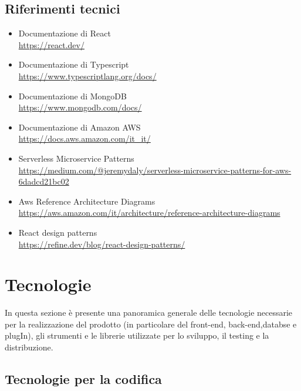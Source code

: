 \documentclass{article}
\begin{document}
{\subsection{Riferimenti tecnici}
\begin{itemize}
\item Documentazione di React \\ \href{ https://react.dev/}{ https://react.dev/}
\item Documentazione di Typescript \\ \href{https://www.typescriptlang.org/docs/}{https://www.typescriptlang.org/docs/}
\item Documentazione di MongoDB \\ \href{https://www.mongodb.com/docs/}{https://www.mongodb.com/docs/}
\item Documentazione di Amazon AWS \\ \href{https://docs.aws.amazon.com/it_it/}{https://docs.aws.amazon.com/it\_it/}
\item Serverless Microservice Patterns \\\href{https://medium.com/@jeremydaly/serverless-microservice-patterns-for-aws-6dadcd21bc02}{https://medium.com/@jeremydaly/serverless-microservice-patterns-for-aws-6dadcd21bc02}
\item Aws Reference Architecture Diagrams \\ \href{https://aws.amazon.com/it/architecture/reference-architecture-diagrams}{https://aws.amazon.com/it/architecture/reference-architecture-diagrams}
\item React design patterns \\ \href{https://refine.dev/blog/react-design-patterns/}{https://refine.dev/blog/react-design-patterns/}
\end{itemize}

\section{Tecnologie}
In questa sezione è presente una panoramica generale delle tecnologie necessarie per la realizzazione del prodotto (in particolare del front-end, back-end,databse e plugIn), gli strumenti e le librerie utilizzate per lo sviluppo, il testing e la distribuzione.

\subsection{Tecnologie per la codifica}

}
\end{document}
